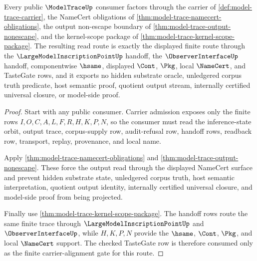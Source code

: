 \begin{theorem}
\label{thm:modeltrace-mature-treatment}
Every public $\ModelTraceUp$ consumer factors through the carrier of \autoref{def:model-trace-carrier}, the NameCert obligations of \autoref{thm:model-trace-namecert-obligations}, the output non-escape boundary of \autoref{thm:model-trace-output-nonescape}, and the kernel-scope package of \autoref{thm:model-trace-kernel-scope-package}. The resulting read route is exactly the displayed finite route through the $\LargeModelInscriptionPointUp$ handoff, the $\ObserverInterfaceUp$ handoff, componentwise $\hsame$, displayed $\Cont$, $\Pkg$, local $\NameCert$, and TasteGate rows, and it exports no hidden substrate oracle, unledgered corpus truth predicate, host semantic proof, quotient output stream, internally certified universal closure, or model-side proof.
\end{theorem}
\begin{proof}
Start with any public consumer. Carrier admission exposes only the finite rows $I,O,C,A,L,F,R,H,K,P,N$, so the consumer must read the inference-state orbit, output trace, corpus-supply row, audit-refusal row, handoff rows, readback row, transport, replay, provenance, and local name.

Apply \autoref{thm:model-trace-namecert-obligations} and \autoref{thm:model-trace-output-nonescape}. These force the output read through the displayed NameCert surface and prevent hidden substrate state, unledgered corpus truth, host semantic interpretation, quotient output identity, internally certified universal closure, and model-side proof from being projected.

Finally use \autoref{thm:model-trace-kernel-scope-package}. The handoff rows route the same finite trace through $\LargeModelInscriptionPointUp$ and $\ObserverInterfaceUp$, while $H,K,P,N$ provide the $\hsame$, $\Cont$, $\Pkg$, and local $\NameCert$ support. The checked TasteGate row is therefore consumed only as the finite carrier-alignment gate for this route.
\end{proof}

